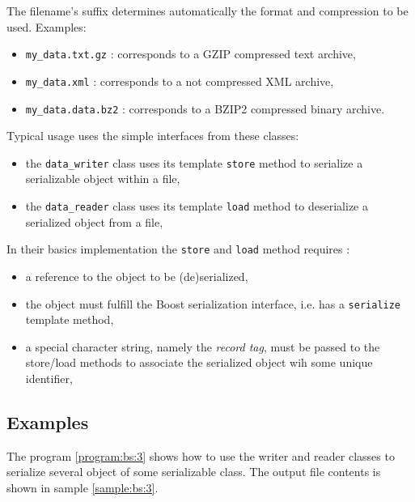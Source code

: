 \documentclass[a4paper,12pt]{article}
\newcommand{\pn}{\par\noindent}
\begin{document}
\pn  The filename's  suffix  determines automatically  the format  and
compression to be used. Examples:

\begin{itemize}
\item \texttt{my\_data.txt.gz} : corresponds to a GZIP compressed text
  archive,
\item  \texttt{my\_data.xml} :  corresponds  to a  not compressed  XML
  archive,
\item \texttt{my\_data.data.bz2}  : corresponds to  a BZIP2 compressed
  binary archive.
\end{itemize}


\pn Typical usage uses the simple interfaces from these classes:

\begin{itemize}    

\item the \texttt{data\_writer} class uses its template \texttt{store} 
  method to serialize a serializable object within a file,

\item the \texttt{data\_reader} class uses its template \texttt{load} 
  method to deserialize a serialized object from a file,
  
\end{itemize}

\pn In their basics implementation the \texttt{store} and \texttt{load} 
method requires :

\begin{itemize}

\item a reference to the object to be (de)serialized,

\item the object must fulfill the Boost serialization interface, i.e.
has a \texttt{serialize} template method,

\item a special character string, namely the \emph{record tag}, must be passed
to the store/load methods to associate the serialized object wih some 
unique identifier,

\end{itemize}

\subsection{Examples}

\pn The program \ref{program:bs:3} shows how to use the writer and reader classes
to serialize several object of some serializable class. The output file contents is shown in sample
\ref{sample:bs:3}.
\end{document}
